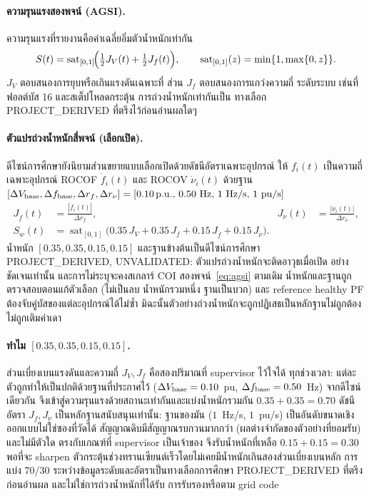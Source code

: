 \documentclass[12pt,a4paper]{article}
\newcommand{\sat}{\operatorname{sat}}
\newcommand{\pu}{\ifmmode\,\mathrm{p.u.}\else\ p.u.\fi}
\begin{document}
\paragraph{ความรุนแรงสองพจน์ (AGSI).}
ความรุนแรงที่รายงานคือค่าเฉลี่ยอิ่มตัวน้ำหนักเท่ากัน
\begin{equation}
  S(t)=\sat_{[0,1]}\!\Bigl(\tfrac12 J_V(t)+\tfrac12 J_f(t)\Bigr),
  \qquad
  \sat_{[0,1]}(z)=\min\{1,\max\{0,z\}\}.
  \label{eq:agsi}
\end{equation}
$J_V$ ตอบสนองการยุบหรือเกินแรงดันเฉพาะที่ ส่วน $J_f$ ตอบสนองการแกว่งความถี่
ระดับระบบ เช่นที่ฟอลต์บัส 16 และสเต็ปโหลดกระตุ้น การถ่วงน้ำหนักเท่ากันเป็น
ทางเลือก \textsf{PROJECT\_DERIVED} ที่ตรึงไว้ก่อนอ่านผลใดๆ

\paragraph{ตัวแปรถ่วงน้ำหนักสี่พจน์ (เลือกเปิด).}
ดีไซน์การศึกษายังนิยามส่วนขยายแบบเลือกเปิดด้วยดัชนีอัตราเฉพาะอุปกรณ์
ให้ $f_i(t)$ เป็นความถี่เฉพาะอุปกรณ์ ROCOF $\dot f_i(t)$ และ ROCOV
$\dot\nu_i(t)$ ด้วยฐาน
$[\Delta V_{\rm base},\Delta f_{\rm base},\Delta r_{f},\Delta r_{\nu}]
=[0.10\pu,\,0.50~\mathrm{Hz},\,1~\mathrm{Hz/s},\,1~\mathrm{pu/s}]$
\begin{equation}
\begin{aligned}
  J_{\dot f}(t)&=\frac{|\dot f_i(t)|}{\Delta r_{f}},&
  J_{\dot\nu}(t)&=\frac{|\dot\nu_i(t)|}{\Delta r_{\nu}},\\
  S_{w}(t)&=\sat_{[0,1]}\!\bigl(
      0.35\,J_V+0.35\,J_f+0.15\,J_{\dot f}+0.15\,J_{\dot\nu}\bigr).&&
\end{aligned}
\label{eq:weighted}
\end{equation}
น้ำหนัก $[0.35,0.35,0.15,0.15]$ และฐานข้างต้นเป็นดีไซน์การศึกษา
\textsf{PROJECT\_DERIVED, UNVALIDATED}: ตัวแปรถ่วงน้ำหนักจะติดอาวุธเมื่อเปิด
อย่างชัดเจนเท่านั้น และการไม่ระบุจะคงสเกลาร์ COI สองพจน์~\eqref{eq:agsi}
ตามเดิม น้ำหนักและฐานถูกตรวจสอบตอนแก้ตัวเลือก (ไม่เป็นลบ น้ำหนักรวมหนึ่ง
ฐานเป็นบวก) และ reference healthy PF ต้องจับคู่บัสของแต่ละอุปกรณ์ได้ไม่ซ้ำ
มิฉะนั้นตัวอย่างถ่วงน้ำหนักจะถูกปฏิเสธเป็นหลักฐานไม่ถูกต้อง ไม่ถูกเติมค่าเดา

\paragraph{ทำไม $[0.35,0.35,0.15,0.15]$.}
ส่วนเบี่ยงเบนแรงดันและความถี่ $J_V,J_f$ คือสองปริมาณที่ supervisor ไว้ใจได้
ทุกช่วงเวลา: แต่ละตัวถูกทำให้เป็นปกติด้วยฐานที่ประกาศไว้
($\Delta V_{\rm base}=0.10$~pu, $\Delta f_{\rm base}=0.50$~Hz)
จากดีไซน์เดียวกัน จึงเข้าสู่ความรุนแรงด้วยสถานะเท่ากันและแบ่งน้ำหนักรวมกัน
$0.35+0.35=0.70$ ดัชนีอัตรา $J_{\dot f}, J_{\dot\nu}$ เป็นหลักฐานสนับสนุนเท่านั้น:
ฐานของมัน ($1$~Hz/s, $1$~pu/s) เป็นอันดับขนาดเชิงออกแบบไม่ใช่ซองที่วัดได้
สัญญาณดิบมีสัญญาณรบกวนมากกว่า (ผลต่างจำกัดของตัวอย่างที่ยอมรับ) และไม่มีตัวใด
ตรงกับเกณฑ์ที่ supervisor เป็นเจ้าของ จึงรับน้ำหนักที่เหลือ $0.15+0.15=0.30$
พอที่จะ sharpen ตัวกระตุ้นช่วงทรานเซียนต์เร็วโดยไม่เคยมีน้ำหนักเกินสองส่วนเบี่ยงเบนหลัก
การแบ่ง 70/30 ระหว่างข้อมูลระดับและอัตราเป็นทางเลือกการศึกษา
\textsf{PROJECT\_DERIVED} ที่ตรึงก่อนอ่านผล และไม่ใช่การถ่วงน้ำหนักที่ได้รับ
การรับรองหรือตาม grid code
\end{document}
